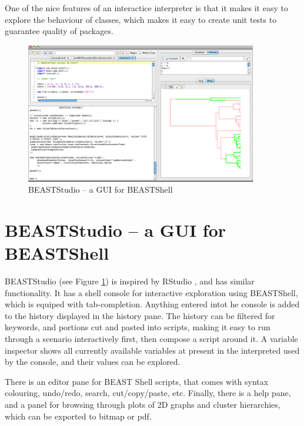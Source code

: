 \documentclass[twoside,11pt]{article}
\begin{document}
One of the nice features of an interactice interpreter is that it makes it easy to
explore the behaviour of classes, which makes it easy to create unit tests to 
guarantee quality of packages.


\begin{figure}
\begin{center}
\includegraphics[width=0.9\textwidth]{BEASTStudio}
\end{center}
\caption{\label{fig.BEASTStudio}BEASTStudio -- a GUI for BEASTShell}
\end{figure}


\section{BEASTStudio -- a GUI for BEASTShell}

BEASTStudio (see Figure \ref{fig.BEASTStudio}) is inspired by RStudio \citep{rstudio}, and has similar functionality. 
It has a shell console for interactive exploration using BEASTShell, which
is equiped with tab-completion. Anything entered intot he console is added to the history displayed 
in the history pane. The history can be filtered for keywords, and portions cut and pasted into 
scripts, making it easy to run through a scenario interactively first, then compose a script around it. 
A variable inspector shows all currently available variables at present in the interpreted used by
the console, and their values can be explored.

There is an editor pane for BEAST Shell scripts, that comes with syntax colouring, 
undo/redo, search, cut/copy/paste, etc. Finally, there is a help pane, and a panel for browsing
through plots of 2D graphs and cluster hierarchies, which can be exported to bitmap
or pdf.

\end{document}
